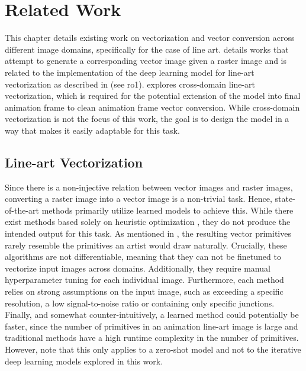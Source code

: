 \chapter{Related Work}
\label{ch:related}
This chapter details existing work on vectorization and vector conversion across different image domains, specifically for the case of line art.  details works that attempt to generate a corresponding vector image given a raster image and is related to the implementation of the deep learning model for line-art vectorization as described in  (see \gls{ro1}).  explores cross-domain line-art vectorization, which is required for the potential extension of the model into final animation frame to clean animation frame vector conversion. While cross-domain vectorization is not the focus of this work, the goal is to design the model in a way that makes it easily adaptable for this task.

\section{Line-art Vectorization}
\label{sec:related.vec}

Since there is a non-injective relation between vector images and raster images, converting a raster image into a vector image is a non-trivial task. Hence, state-of-the-art methods primarily utilize learned models to achieve this. While there exist methods based solely on heuristic optimization \citep{Selinger03potrace:a, autotrace, 10.1145/2421636.2421640, DBLP:journals/tog/BessmeltsevS19,https://doi.org/10.1111/cgf.14485}, they do not produce the intended output for this task. As mentioned in , the resulting vector primitives rarely resemble the primitives an artist would draw naturally. Crucially, these algorithms are not differentiable, meaning that they can not be finetuned to vectorize input images across domains. Additionally, they require manual hyperparameter tuning for each individual image. Furthermore, each method relies on strong assumptions on the input image, such as exceeding a specific resolution, a low signal-to-noise ratio or containing only specific junctions. Finally, and somewhat counter-intuitively, a learned method could potentially be faster, since the number of primitives in an animation line-art image is large and traditional methods have a high runtime complexity in the number of primitives. However, note that this only applies to a zero-shot model and not to the iterative deep learning models explored in this work.

